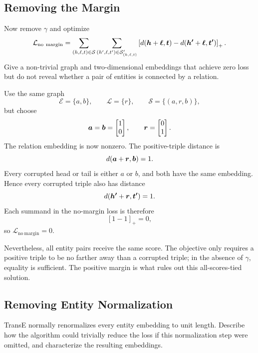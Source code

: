 \subsection{Removing the Margin}

Now remove \(\gamma\) and optimize
\[
  \mathcal L_{\mathrm{no\ margin}}
  =
  \sum_{(h,\ell,t)\in\mathcal S}
  \sum_{(h',\ell,t')\in\mathcal S'_{(h,\ell,t)}}
  \left[
    d(\vect h+\vect\ell,\vect t)
    -d(\vect{h'}+\vect\ell,\vect{t'})
  \right]_+.
\]
Give a non-trivial graph and two-dimensional embeddings that achieve zero
loss but do not reveal whether a pair of entities is connected by a relation.

\begin{solution}
Use the same graph
\[
  \mathcal E=\{a,b\},\qquad
  \mathcal L=\{r\},\qquad
  \mathcal S=\{(a,r,b)\},
\]
but choose
\[
  \bm{a}=\bm{b}=
  \begin{bmatrix}1\\0\end{bmatrix},
  \qquad
  \bm{r}=
  \begin{bmatrix}0\\1\end{bmatrix}.
\]
The relation embedding is now nonzero.  The positive-triple distance is
\[
  d(\bm{a}+\bm{r},\bm{b})=1.
\]
Every corrupted head or tail is either \(a\) or \(b\), and both have the same
embedding.  Hence every corrupted triple also has distance
\[
  d(\bm{h'}+\bm{r},\bm{t'})=1.
\]
Each summand in the no-margin loss is therefore
\[
  [1-1]_+=0,
\]
so \(\mathcal L_{\mathrm{no\ margin}}=0\).

Nevertheless, all entity pairs receive the same score.  The objective only
requires a positive triple to be no farther away than a corrupted triple; in
the absence of \(\gamma\), equality is sufficient.  The positive margin is
what rules out this all-scores-tied solution.
\end{solution}

\subsection{Removing Entity Normalization}

TransE normally renormalizes every entity embedding to unit length. Describe
how the algorithm could trivially reduce the loss if this normalization step
were omitted, and characterize the resulting embeddings.

